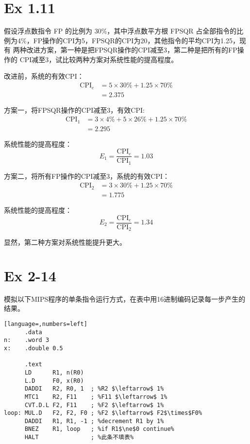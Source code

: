 \section{Ex 1.11}

假设浮点数指令 FP 的比例为 30\%，其中浮点数平方根 FPSQR 占全部指令的比
例为4\%，FP操作的CPI为5，FPSQR的CPI为20，其他指令的平均CPI为1.25，现有
两种改进方案，第一种是把FPSQR操作的CPI减至3，第二种是把所有的FP操作的
CPI减至3，试比较两种方案对系统性能的提高程度。

\begin{solve}
  改进前，系统的有效CPI：
  \begin{align*}
    \mathrm{CPI}_e &= 5 \times 30\% + 1.25 \times 70\%\\
                   &= 2.375
  \end{align*}
  
  方案一，将FPSQR操作的CPI减至3，有效CPI:
  \begin{align*}
    \mathrm{CPI}_1 &= 3 \times 4\% + 5 \times 26\% + 1.25 \times 70\%\\
                   &= 2.295
  \end{align*}
  
  系统性能的提高程度：\[
    E_1 = \frac{\mathrm{CPI}_e}{\mathrm{CPI}_1}
       = 1.03\]

  方案二，将所有FP操作的CPI减至3，系统的有效CPI：
  \begin{align*}
    \mathrm{CPI}_2 &= 3 \times 30\% + 1.25 \times 70\%\\
                   &= 1.775
  \end{align*}

  系统性能的提高程度：\[E_2 = \frac{\mathrm{CPI}_e}{\mathrm{CPI}_2} = 1.34\]

  显然，第二种方案对系统性能提升更大。
\end{solve}

\section{Ex 2-14}

模拟以下MIPS程序的单条指令运行方式，在表中用16进制编码记录每一步产生的结果。

\begin{lstlisting}[language=,numbers=left]
      .data
n:    .word 3
x:    .double 0.5 

      .text
      LD      R1, n(R0)
      L.D     F0, x(R0)
      DADDI   R2, R0, 1  ; %R2 $\leftarrow$ 1%
      MTC1    R2, F11    ; %F11 $\leftarrow$ 1%
      CVT.D.L F2, F11    ; %F2 $\leftarrow$ 1%
loop: MUL.D   F2, F2, F0 ; %F2 $\leftarrow$ F2$\times$F0%
      DADDI   R1, R1, -1 ; %decrement R1 by 1%
      BNEZ    R1, loop   ; %if R1$\ne$0 continue%
      HALT               ; %此条不填表%
\end{lstlisting}

